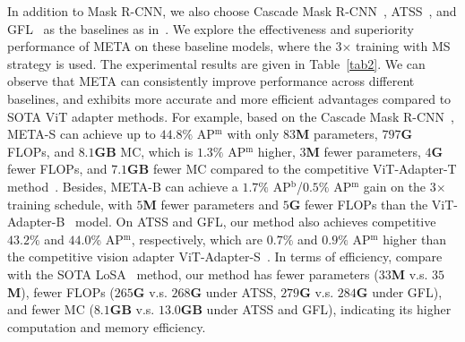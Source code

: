 In addition to Mask R-CNN, we also choose Cascade Mask R-CNN~\citep{cai2019cascade}, ATSS~\citep{zhang2020bridging}, and GFL~\citep{li2020generalized} as the baselines as in~\cite{chen2022vision,mercea2024time}. We explore the effectiveness and superiority performance of META on these baseline models, where the 3$\times$ training with MS strategy is used. 
% 
The experimental results are given in Table~\ref{tab2}. We can observe that META can consistently improve performance across different baselines, and exhibits more accurate and more efficient advantages compared to SOTA ViT adapter methods. 
%
For example, based on the Cascade Mask R-CNN~\citep{cai2019cascade}, META-S can achieve up to $44.8\%$ AP$^\textrm{m}$ with only $83$\textbf{M} parameters, $797$\textbf{G} FLOPs, and $8.1$\textbf{GB} MC, which is $1.3\%$ AP$^\textrm{m}$ higher, $3$\textbf{M} fewer parameters, $4$\textbf{G} fewer FLOPs, and $7.1$\textbf{GB} fewer MC compared to the competitive ViT-Adapter-T method~\citep{chen2022vision}. 
%
Besides, META-B can achieve a $1.7\%$ AP$^\textrm{b}$/$0.5\%$ AP$^\textrm{m}$ gain on the 3$\times$ training schedule, with $5$\textbf{M} fewer parameters and $5$\textbf{G} fewer FLOPs than the ViT-Adapter-B~\citep{chen2022vision} model.
%
On ATSS and GFL, our method also achieves competitive $43.2\%$ and $44.$0\% AP$^\textrm{m}$, respectively, which are $0.7\%$ and $0.9\%$ AP$^\textrm{m}$ higher than the competitive vision adapter ViT-Adapter-S~\citep{chen2022vision}. 
%
In terms of efficiency, compare with the SOTA LoSA~\citep{mercea2024time} method,  our method has fewer parameters ($33$\textbf{M} v.s. $35$\textbf{M}), fewer FLOPs ($265$\textbf{G} v.s. $268$\textbf{G} under ATSS, $279$\textbf{G} v.s. $284$\textbf{G} under GFL), and fewer MC ($8.1$\textbf{GB} v.s. $13.0$\textbf{GB} under ATSS and GFL), indicating its higher computation and memory efficiency.
%  

